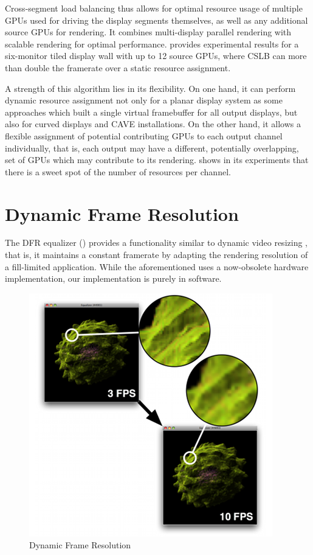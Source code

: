 Cross-segment load balancing thus allows for optimal resource usage of multiple
GPUs used for driving the display segments themselves, as well as any additional
source GPUs for rendering. It combines multi-display parallel rendering with
scalable rendering for optimal performance. \cite{EEP:11} provides experimental
results for a six-monitor tiled display wall with up to 12 source GPUs, where
CSLB can more than double the framerate over a static resource assignment.

A strength of this algorithm lies in its flexibility. On one hand, it can
perform dynamic resource assignment not only for a planar display system as
some approaches which built a single virtual framebuffer for all output
displays, but also for curved displays and CAVE installations. On the other
hand, it allows a flexible assignment of potential contributing GPUs to each
output channel individually, that is, each output may have a different,
potentially overlapping, set of GPUs which may contribute to its rendering.
\cite{EEP:11} shows in its experiments that there is a sweet spot of the number
of resources per channel.

\clearpage
\section{Dynamic Frame Resolution}

The DFR equalizer () provides a functionality similar to dynamic
video resizing \cite{MBDM:97}, that is, it maintains a constant framerate by
adapting the rendering resolution of a fill-limited application. While the
aforementioned uses a now-obsolete hardware implementation, our implementation
is purely in software.

\begin{figure}
  \includegraphics[width=.618\textwidth]{images/dfr}
  \caption{\label{fdfr}Dynamic Frame Resolution}
\end{figure}

